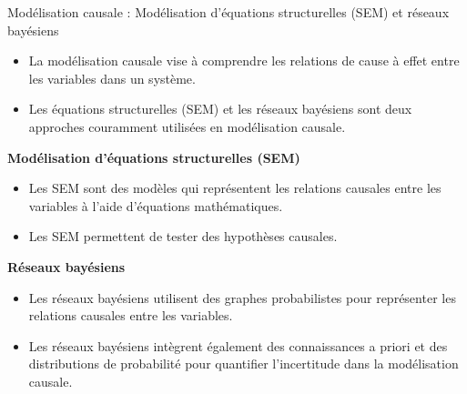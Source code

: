 \documentclass{beamer}
\begin{document}
\begin{frame}{Modélisation causale : Modélisation d'équations structurelles (SEM) et réseaux bayésiens}
	\begin{itemize}
		\item La modélisation causale vise à comprendre les relations de cause à effet entre les variables dans un système.
		\item Les équations structurelles (SEM) et les réseaux bayésiens sont deux approches couramment utilisées en modélisation causale.
	\end{itemize}
	
	\vspace{0.2cm}
	
	\textbf{Modélisation d'équations structurelles (SEM)}
	\begin{itemize}
		\item Les SEM sont des modèles qui représentent les relations causales entre les variables à l'aide d'équations mathématiques.
		\item Les SEM permettent de tester des hypothèses causales.
	\end{itemize}
	
	\vspace{0.2cm}
	
	\textbf{Réseaux bayésiens}
	\begin{itemize}
		\item Les réseaux bayésiens utilisent des graphes probabilistes pour représenter les relations causales entre les variables.
		\item Les réseaux bayésiens intègrent également des connaissances a priori et des distributions de probabilité pour quantifier l'incertitude dans la modélisation causale.
	\end{itemize}	
\end{frame}
\end{document}
